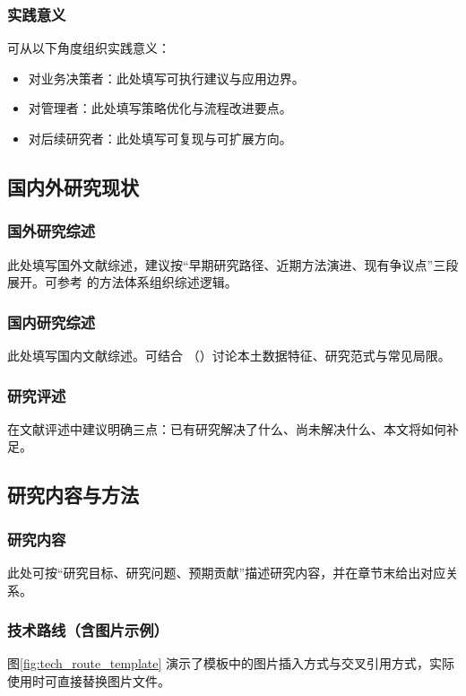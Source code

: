 \documentclass[UTF8,AutoFakeBold=1,AutoFakeSlant,zihao=-4]{SCAU}
\begin{document}
\subsubsection{实践意义}
可从以下角度组织实践意义：
\begin{itemize}
  \item 对业务决策者：此处填写可执行建议与应用边界。
  \item 对管理者：此处填写策略优化与流程改进要点。
  \item 对后续研究者：此处填写可复现与可扩展方向。
\end{itemize}

\subsection{国内外研究现状}

\subsubsection{国外研究综述}
此处填写国外文献综述，建议按“早期研究路径、近期方法演进、现有争议点”三段展开。可参考 \cite{wilson2021machine} 的方法体系组织综述逻辑。

\subsubsection{国内研究综述}
此处填写国内文献综述。可结合 \citeauthor{zhang2023example}（\citeyear{zhang2023example}）讨论本土数据特征、研究范式与常见局限。

\subsubsection{研究评述}
在文献评述中建议明确三点：已有研究解决了什么、尚未解决什么、本文将如何补足。

\subsection{研究内容与方法}

\subsubsection{研究内容}
此处可按“研究目标、研究问题、预期贡献”描述研究内容，并在章节末给出对应关系。

\subsubsection{技术路线（含图片示例）}
图\ref{fig:tech_route_template} 演示了模板中的图片插入方式与交叉引用方式，实际使用时可直接替换图片文件。
\end{document}
